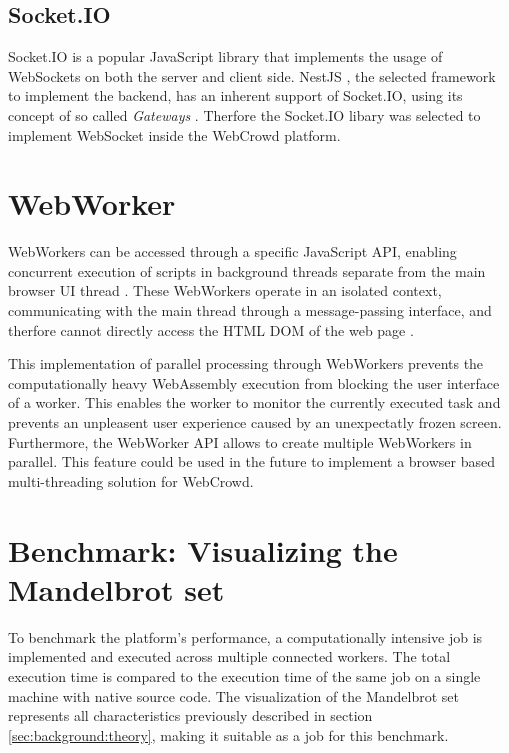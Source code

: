 \subsection{Socket.IO}
Socket.IO \cite{methodology:websockets2} is a popular JavaScript library that implements the usage of WebSockets on both the server and client side. NestJS \cite{methodology:nestjs}, the selected framework to implement the backend, has an inherent support of Socket.IO, using its concept of so called \emph{Gateways} \cite{methodology:nestjs}. Therfore the Socket.IO libary was selected to implement WebSocket inside the WebCrowd platform.

\section{WebWorker}
\label{sec:methodology:webworker}
WebWorkers can be accessed through a specific JavaScript \ac{API}, enabling concurrent execution of scripts in background threads separate from the main browser UI thread \cite{methodology:webworkers}. These WebWorkers operate in an isolated context, communicating with the main thread through a message-passing interface, and therfore cannot directly access the \acs{HTML} \acs{DOM} of the web page \cite{methodology:webworkers}. 

This implementation of parallel processing through WebWorkers prevents the computationally heavy WebAssembly execution from blocking the user interface of a worker. This enables the worker to monitor the currently executed task and prevents an unpleasent user experience caused by an unexpectatly frozen screen. Furthermore, the WebWorker \ac{API} allows to create multiple WebWorkers in parallel. This feature could be used in the future to implement a browser based multi-threading solution for WebCrowd.

\section{Benchmark: Visualizing the Mandelbrot set}
\label{sec:methodology:benchmark}
To benchmark the platform's performance, a computationally intensive job is implemented and executed across multiple connected workers. The total execution time is compared to the execution time of the same job on a single machine with native source code. The visualization of the Mandelbrot set represents all characteristics previously described in section \ref{sec:background:theory}, making it suitable as a job for this benchmark.

